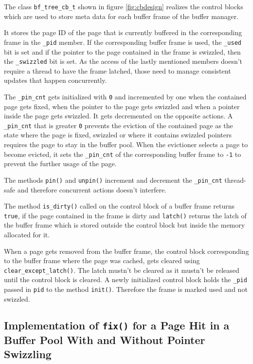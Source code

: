 	The class \lstinline{bf_tree_cb_t} shown in figure \ref{fig:cbdesign} realizes the control blocks which are used to store meta data for each buffer frame of the buffer manager.
	
	It stores the page ID of the page that is currently buffered in the corresponding frame in the \lstinline{_pid} member. If the corresponding buffer frame is used, the \lstinline{_used} bit is set and if the pointer to the page contained in the frame is swizzled, then the \lstinline{_swizzled} bit is set. As the access of the lastly mentioned members doesn't require a thread to have the frame latched, those need to manage consistent updates that happen concurrently.
	
	The \lstinline{_pin_cnt} gets initialized with \lstinline{0} and incremented by one when the contained page gets fixed, when the pointer to the page gets swizzled and when a pointer inside the page gets swizzled. It gets decremented on the opposite actions. A \lstinline{_pin_cnt} that is greater \lstinline{0} prevents the eviction of the contained page as the state where the page is fixed, swizzled or where it contains swizzled pointers requires the page to stay in the buffer pool. When the evictioner selects a page to become evicted, it sets the \lstinline{_pin_cnt} of the corresponding buffer frame to \lstinline{-1} to prevent the further usage of the page.
	
	The methods \lstinline{pin()} and \lstinline{unpin()} increment and decrement the \lstinline{_pin_cnt} thread-safe and therefore concurrent actions doesn't interfere.
	
	The method \lstinline{is_dirty()} called on the control block of a buffer frame returns \lstinline{true}, if the page contained in the frame is dirty and \lstinline{latch()} returns the latch of the  buffer frame which is stored outside the control block but inside the memory allocated for it.
	
	When a page gets removed from the buffer frame, the control block corresponding to the buffer frame where the page was cached, gets cleared using \lstinline{clear_except_latch()}. The latch mustn't be cleared as it mustn't be released until the control block is cleared. A newly initialized control block holds the \lstinline{_pid} passed in \lstinline{pid} to the method \lstinline{init()}. Therefore the frame is marked used and not swizzled.

\subsection[Comparison of the Implementations for a Page Hit]{Implementation of \lstinline{fix()} for a Page Hit in a Buffer Pool With and Without Pointer Swizzling} \label{subsec:pagehit}

